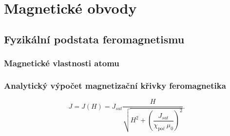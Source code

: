 {
\chapter{Magnetické obvody}\label{teo:IchapVI}
\minitoc

  \section{Fyzikální podstata feromagnetismu}\label{teo:IchapVIsecI}
    \subsection{Magnetické vlastnosti atomu}
    \subsection{Analytický výpočet magnetizační křivky feromagnetika}
      \begin{equation}  \label{TEO:eq011}
        \boxed{J = J(H) = J_{sat}\dfrac{H}{\sqrt{H^2 + 
              \left(\dfrac{J_{sat}}{\chi_{\text{poč}}\,\mu_0}\right)^2}}
              }.
      \end{equation}
      
} %
